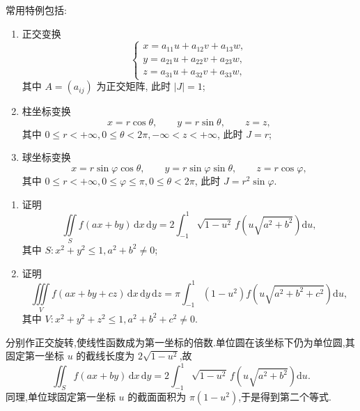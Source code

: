 \begin{remark}
    常用特例包括:
    \begin{enumerate}
        \item 正交变换
              \[
                  \begin{cases}
                      x=a_{11}u+a_{12}v+a_{13}w, \\
                      y=a_{21}u+a_{22}v+a_{23}w, \\
                      z=a_{31}u+a_{32}v+a_{33}w,
                  \end{cases}
              \]
              其中 $A=(a_{ij})$ 为正交矩阵, 此时 $|J|=1$;
        \item 柱坐标变换
              \[
                  x=r\cos\theta,\qquad y=r\sin\theta,\qquad z=z,
              \]
              其中 $0\leq r<+\infty,0\leq\theta<2\pi,-\infty<z<+\infty$, 此时 $J=r$;
        \item 球坐标变换
              \[
                  x=r\sin\varphi\cos\theta,\qquad
                  y=r\sin\varphi\sin\theta,\qquad
                  z=r\cos\varphi,
              \]
              其中 $0\leq r<+\infty,0\leq\varphi\leq\pi,0\leq\theta<2\pi$, 此时 $J=r^2\sin\varphi$.
    \end{enumerate}
\end{remark}

\begin{example}
    \begin{enumerate}
        \item 证明
              \[
                  \displaystyle\iint\limits_S f(ax+by)\,\mathrm{d}x\,\mathrm{d}y
                  =2\int_{-1}^1\sqrt{1-u^2}\,f\left(u\sqrt{a^2+b^2}\right)\mathrm{d}u,
              \]
              其中 $S:x^2+y^2\leq1,a^2+b^2\ne0$;
        \item 证明
              \[
                  \displaystyle\iiint\limits_Vf(ax+by+cz)\,\mathrm{d}x\,\mathrm{d}y\,\mathrm{d}z
                  =\pi\int_{-1}^1(1-u^2)f\left(u\sqrt{a^2+b^2+c^2}\right)\mathrm{d}u,
              \]
              其中 $V:x^2+y^2+z^2\leq1,a^2+b^2+c^2\ne0$.
    \end{enumerate}
\end{example}
\exampleblank

\begin{solution}
    分别作正交旋转,使线性函数成为第一坐标的倍数.单位圆在该坐标下仍为单位圆,其固定第一坐标 $u$ 的截线长度为 $2\sqrt{1-u^2}$,故
    \[
        \displaystyle\iint_Sf(ax+by)\,\mathrm{d}x\,\mathrm{d}y
        =2\int_{-1}^1\sqrt{1-u^2}\,f\left(u\sqrt{a^2+b^2}\right)\mathrm{d}u.
    \]
    同理,单位球固定第一坐标 $u$ 的截面面积为 $\pi(1-u^2)$,于是得到第二个等式.
\end{solution}

